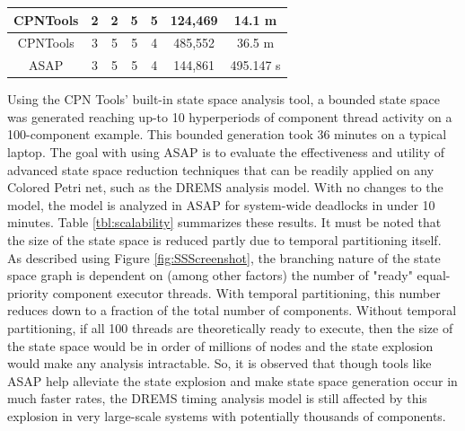 \begin{table}[h]
\begin{tabular}{|c|c|c|c|c|c|c|}
		CPNTools      & 2                                                            & \textbf{2}                                                                     & 5                                                                                     & 5                                                                           & 124,469                                                                   & 14.1 m                                                              \\ \hline
		CPNTools      & 3                                                            & 5                                                                              & 5                                                                                     & 4                                                                           & 485,552                                                                   & 36.5 m                                                              \\ \hline
		ASAP          & 3                                                            & 5                                                                              & 5                                                                                     & 4                                                                           & 144,861                                                                   & 495.147 s                                                           \\ \hline
	\end{tabular}
\end{table}

Using the CPN Tools' built-in state space analysis tool, a bounded state space was generated reaching up-to 10 hyperperiods of component thread activity on a 100-component example. This bounded generation took 36 minutes on a typical laptop. The goal with using ASAP is to evaluate the effectiveness and utility of advanced state space reduction techniques that can be readily applied on any Colored Petri net, such as the DREMS analysis model. With no changes to the model, the model is analyzed in ASAP for system-wide deadlocks in under 10 minutes. Table \ref{tbl:scalability} summarizes these results. It must be noted that the size of the state space is reduced partly due to temporal partitioning itself. As described using Figure \ref{fig:SSScreenshot}, the branching nature of the state space graph is dependent on (among other factors) the number of "ready" equal-priority component executor threads. With temporal partitioning, this number reduces down to a fraction of the total number of components. Without temporal partitioning, if all 100 threads are theoretically ready to execute, then the size of the state space would be in order of millions of nodes and the state explosion would make any analysis intractable. So, it is observed that though tools like ASAP help alleviate the state explosion and make state space generation occur in much faster rates, the DREMS timing analysis model is still affected by this explosion in very large-scale systems with potentially thousands of components.


